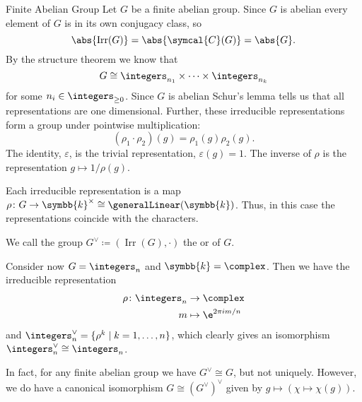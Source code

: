 \documentclass[fleqn]{NotesClass}
\renewcommand{\field}{\symbb{k}}
\newcommand{\isomorphic}{\cong}
\DeclareMathOperator{\Irr}{Irr}
\newcommand{\conjugacyClasses}{\symcal{C}}
\begin{document}
    \begin{exm}{Finite Abelian Group}{}
        Let \(G\) be a finite abelian group.
        Since \(G\) is abelian every element of \(G\) is in its own conjugacy class, so
        \begin{equation}
            \abs{\Irr(G)} = \abs{\conjugacyClasses(G)} = \abs{G}.
        \end{equation}
        By the structure theorem we know that
        \begin{equation}
            G \isomorphic \integers_{n_1} \times \dotsb \times \integers_{n_k}
        \end{equation}
        for some \(n_i \in \integers_{\ge 0}\).
        Since \(G\) is abelian Schur's lemma tells us that all representations are one dimensional.
        Further, these irreducible representations form a group under pointwise multiplication:
        \begin{equation}
            (\rho_1 \cdot \rho_2)(g) = \rho_1(g)\rho_2(g).
        \end{equation}
        The identity, \(\varepsilon\), is the trivial representation, \(\varepsilon(g) = 1\).
        The inverse of \(\rho\) is the representation \(g \mapsto 1/\rho(g)\).
        
        Each irreducible representation is a map \(\rho \colon G \to \field^{\times} \isomorphic \generalLinear(\field)\).
        Thus, in this case the representations coincide with the characters.
        
        We call the group \(G^{\vee} \coloneqq (\Irr(G), \cdot)\) the  or  of \(G\).
        
        Consider now \(G = \integers_n\) and \(\field = \complex\).
        Then we have the irreducible representation
        \begin{align}
            \rho \colon \integers_n &\to \complex\\
            m &\mapsto \e^{2\pi im/n}
        \end{align}
        and \(\integers_n^{\vee} = \{\rho^k \mid k = 1, \dotsc, n\}\), which clearly gives an isomorphism \(\integers_n^{\vee} \isomorphic \integers_n\).
        
        In fact, for any finite abelian group we have \(G^{\vee} \isomorphic G\), but not uniquely.
        However, we do have a canonical isomorphism \(G \isomorphic (G^{\vee})^{\vee}\) given by \(g \mapsto (\chi \mapsto \chi(g))\).
    \end{exm}
    
\end{document}

